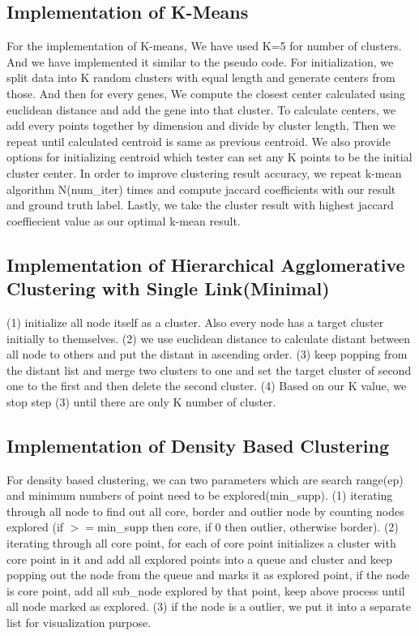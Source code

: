 \documentclass[fleqn]{llncs}
\begin{document}
\subsection{Implementation of K-Means}
For the implementation of K-means, We have used K=5 for number of clusters. And we have implemented it similar to the pseudo code. For initialization, we split data into K random clusters with equal length and generate centers from those. And then for every genes, We compute the closest center calculated using euclidean distance and add the gene into that cluster. To calculate centers, we add every points together by dimension and divide by cluster length, Then we repeat until calculated centroid is same as previous centroid. We also provide options for initializing centroid which tester can set any K points to be the initial cluster center. In order to improve clustering result accuracy, we repeat k-mean algorithm N(num_iter) times and compute jaccard coefficients with our result and ground truth label. Lastly, we take the cluster result with highest jaccard coeffiecient value as our optimal k-mean result.


\subsection{Implementation of Hierarchical Agglomerative Clustering with Single Link(Minimal)}
(1) initialize all node itself as a cluster. Also every node has a target cluster initially to themselves. (2) we use euclidean distance to calculate distant between all node to others and put the distant in ascending order. (3) keep popping from the distant list and merge two clusters to one and set the target cluster of second one to the first and then delete the second cluster. (4) Based on our K value, we stop step (3) until there are only K number of cluster.

\subsection{Implementation of Density Based Clustering}
For density based clustering, we can two parameters which are search range(ep) and minimum numbers of point need to be explored(min\_supp). (1) iterating through all node to find out all core, border and outlier node by counting nodes explored (if ${>=}$min\_supp then core, if 0 then outlier, otherwise border). (2) iterating through all core point, for each of core point initializes a cluster with core point in it and add all explored points into a queue and cluster and keep popping out the node from the queue and marks it as explored point, if the node is core point, add all sub_node explored by that point, keep above process until all node marked as explored. (3) if the node is a outlier, we put it into a separate list for visualization purpose.
\end{document}
